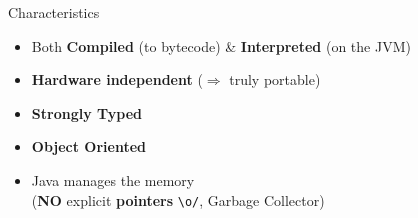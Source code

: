 \documentclass[English,c,%
hyperref={%
    pdftitle={FISA-DE2 OOP in Java},%
    pdfauthor={Muller, Gravier, Laforest, Subercaze},%
    pdfsubject={OOP in Java},%
    pdfkeywords={OOP, Java},%
    colorlinks=true,%
    urlcolor=blue,%
    linkcolor=%
    },%
xcolor={pdftex,svgnames} %
]{beamer}
\begin{document}
\begin{frame}{Characteristics}
  \begin{itemize}
    \item Both \textbf{Compiled} (to bytecode) \& \textbf{Interpreted} (on the JVM)
    \vspace{.5em}
    \item \textbf{Hardware independent} ($\Rightarrow$ truly portable)\\
    \vspace{.5em}
    \item \textbf{Strongly Typed}
    \vspace{.5em}
    \item \textbf{Object Oriented}
    \vspace{.5em}
    \item Java manages the memory
    \hspace{3.3cm}\\[-1em]
    (\textbf{NO} explicit \textbf{pointers} \texttt{\textbackslash{}o/}, Garbage Collector)
  \end{itemize}
\end{frame}
\end{document}
